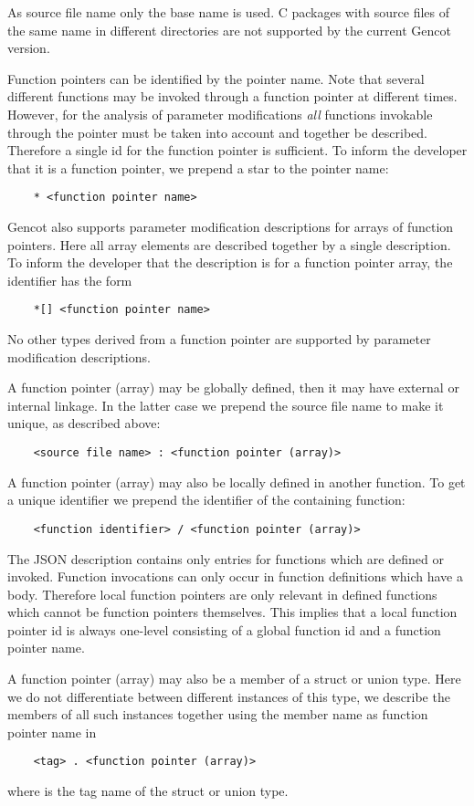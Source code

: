 As source file name only the base name is used. C packages with source files of the same name in different directories are
not supported by the current Gencot version.

Function pointers can be identified by the pointer name. Note that several different functions may be invoked through
a function pointer at different times. However, for the analysis of parameter modifications \textit{all} functions
invokable through the pointer must be taken into account and together be described. Therefore a single id for the function
pointer is sufficient. To inform the developer that it is a function pointer, we prepend a star to the pointer name:
\begin{verbatim}
    * <function pointer name>
\end{verbatim}

Gencot also supports parameter modification descriptions for arrays of function pointers. Here all array elements
are described together by a single description. To inform the developer that the description is for a function
pointer array, the identifier has the form
\begin{verbatim}
    *[] <function pointer name>
\end{verbatim}
No other types derived from a function pointer are supported by parameter modification descriptions.

A function pointer (array) may be globally defined, then it may have external or internal linkage. In the latter case we
prepend the source file name to make it unique, as described above:
\begin{verbatim}
    <source file name> : <function pointer (array)>
\end{verbatim}

A function pointer (array) may also be locally defined in another function. To get a unique identifier we prepend the 
identifier of the containing function:
\begin{verbatim}
    <function identifier> / <function pointer (array)>
\end{verbatim}
The JSON description contains only entries for functions which are defined or invoked. Function invocations can only
occur in function definitions which have a body. Therefore local function pointers are only relevant in defined
functions which cannot be function pointers themselves. This implies that a local function pointer id is always 
one-level consisting of a global function id and a function pointer name.

A function pointer (array) may also be a member of a struct or union type. Here we do not differentiate between different instances 
of this type, we describe the members of all such instances together using the member name as function pointer name in
\begin{verbatim}
    <tag> . <function pointer (array)>
\end{verbatim}
where  is the tag name of the struct or union type. 

